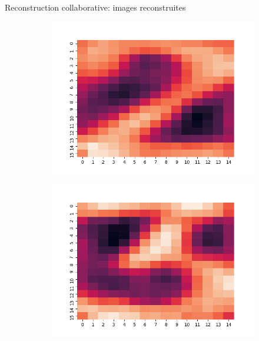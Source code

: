 \documentclass[hyperref={pdfpagelabels=false}]{beamer}
\begin{document}
\begin{frame}{Reconstruction collaborative: images reconstruites}
\begin{figure}[h]
\begin{subfigure}[c]{0.18\textwidth}
                \includegraphics[scale=.12]{2}
            \end{subfigure}
            \begin{subfigure}[c]{0.18\textwidth}
                \includegraphics[scale=.12]{3}
            \end{subfigure}
            \begin{subfigure}[c]{0.18\textwidth}

\end{subfigure}
\end{figure}
\end{frame}
\end{document}
